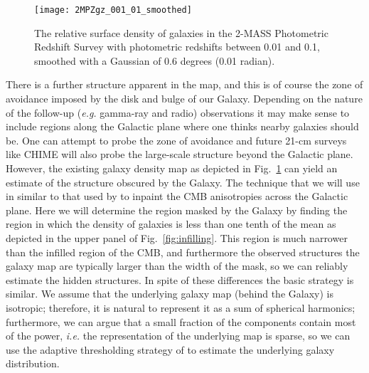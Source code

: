 \documentclass[useAMS,usenatbib]{mn2e}
\begin{document}
\begin{figure}
  \texttt{[image: 2MPZgz\_001\_01\_smoothed]}
  \caption{The relative surface density of galaxies in the 2-MASS Photometric Redshift Survey with photometric redshifts between 0.01 and 0.1, smoothed with a Gaussian of 0.6 degrees (0.01 radian).}
  \label{fig:galmap}
\end{figure}
There is a further structure apparent in the map, and this is of
course the zone of avoidance imposed by the disk and bulge of our
Galaxy. Depending on the nature of the follow-up
({\em e.g.} gamma-ray and radio) observations it may make
sense to include regions along the Galactic plane where one thinks
nearby galaxies should be. One can attempt to probe the zone of avoidance
\citep[e.g][]{2000AJ....120..298J} and future 21-cm surveys like CHIME
\citep{2014era..conf10102V} will also probe the large-scale structure
beyond the Galactic plane.   However, the existing galaxy density map
as depicted in Fig.~\ref{fig:galmap} can yield an estimate of the
structure obscured by the Galaxy.  The technique that we will use in
similar to that used by \citet{2008StMet...5..289A} to inpaint the CMB
anisotropies across the Galactic plane.  Here we will determine the
region masked by the Galaxy by finding the region in which the density
of galaxies is less than one tenth of the mean as depicted in the
upper panel of Fig.~\ref{fig:infilling}.  This region is much narrower
than the infilled region of the CMB, and furthermore the observed
structures the galaxy map are typically larger than the width of the
mask, so we can reliably estimate the hidden structures.  In spite of
these differences the basic strategy is similar.  We assume that the
underlying galaxy map (behind the Galaxy) is isotropic; therefore, it
is natural to represent it as a sum of spherical harmonics;
furthermore, we can argue that a small fraction of the components
contain most of the power, {\em i.e.} the representation of the
underlying map is sparse, so we can use the adaptive thresholding
strategy of \citet{2007ITIP...16.2675B} to estimate the underlying
galaxy distribution.
\end{document}
